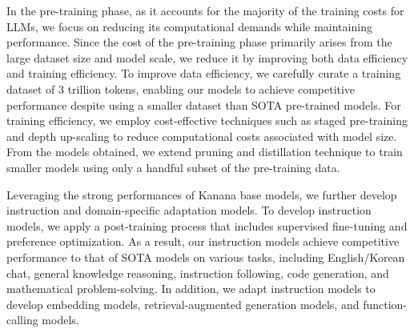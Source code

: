 In the pre-training phase, as it accounts for the majority of the training costs for LLMs, we focus on reducing its computational demands while maintaining performance.
Since the cost of the pre-training phase primarily arises from the large dataset size and model scale, we reduce it by improving both data efficiency and training efficiency.
To improve data efficiency, we carefully curate a training dataset of 3 trillion tokens, enabling our models to achieve competitive performance despite using a smaller dataset than SOTA pre-trained models.
For training efficiency, we employ cost-effective techniques such as staged pre-training \citep{minicpm, ibrahim2024simple-and-scalable} and depth up-scaling \citep{kim2023solar} to reduce computational costs associated with model size.
From the models obtained, we extend pruning and distillation technique \citep{muralidharan2024compact} to train smaller models using only a handful subset of the pre-training data.



Leveraging the strong performances of Kanana base models, we further develop instruction and domain-specific adaptation models.
To develop instruction models, we apply a post-training process that includes supervised fine-tuning and preference optimization.
As a result, our instruction models achieve competitive performance to that of SOTA models on various tasks, including English/Korean chat, general knowledge reasoning, instruction following, code generation, and mathematical problem-solving.
In addition, we adapt instruction models to develop embedding models, retrieval-augmented generation models, and function-calling models.
